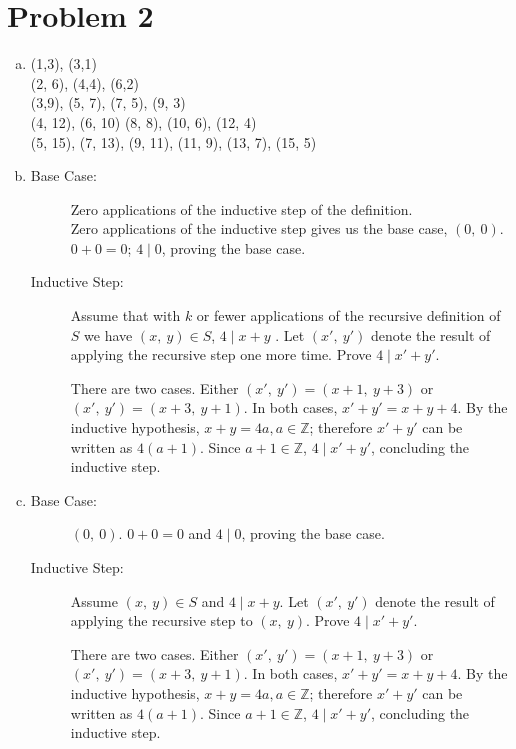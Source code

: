 \documentclass[11pt]{article}
\begin{document}
\section*{Problem 2}
	\begin{enumerate}[(a)]
		\item			
			(1,3), (3,1) \\
			(2, 6), (4,4), (6,2)	\\
			(3,9), (5, 7), (7, 5), (9, 3) \\
			(4, 12), (6, 10) (8, 8), (10, 6), (12, 4)\\
			(5, 15), (7, 13), (9, 11), (11, 9), (13, 7), (15, 5)
			
		\item \begin{description}
			
		\item[Base Case:] Zero applications of the inductive step of the 
		definition.\\
		
		Zero applications of the inductive step gives us the base case, $(0,\ 0)
		$. $0+0 = 0$; $4 \mid 0$, proving the base case.
		
		\item[Inductive Step:] Assume that with $k$ or fewer applications of the
		recursive definition of $S$ we have $(x,\ y) \in S$, $4 \mid x + y$ . 
		Let $(x',\ y')$ denote the result of applying the recursive step one 
		more time. Prove $4\mid x' + y'$.
		
		
		There are two cases. Either $(x',\ y') = (x + 1,\ y+3)$ or $(x',\ y') = 
		(x + 3,\ y+1)$. In both cases, $x' + y' = x + y + 4$. By the inductive
		hypothesis, $x + y = 4a, a \in \mathbb{Z}$; therefore $x' + y'$ can be
		written as $4(a + 1)$. Since $a+1 \in \mathbb{Z}$, $4 \mid x' + y'$,
		concluding the inductive step.
		\end{description}
		
		\item \begin{description}
		
		\item[Base Case:] $(0,\ 0)$.	$0 + 0 = 0$ and $4 \mid 0$, proving the
		base case.
		
		\item[Inductive Step:] Assume $(x,\ y) \in S$ and $4 \mid x+y$. Let
		$(x',\ y')$ denote the result of applying the recursive step to $(x,\ y)
		$. Prove $4 \mid x' + y'$.
		
		There are two cases. Either $(x',\ y') = (x + 1,\ y+3)$ or $(x',\ y') = 
		(x + 3,\ y+1)$. In both cases, $x' + y' = x + y + 4$. By the inductive
		hypothesis, $x + y = 4a, a \in \mathbb{Z}$; therefore $x' + y'$ can be
		written as $4(a + 1)$. Since $a+1 \in \mathbb{Z}$, $4 \mid x' + y'$,
		concluding the inductive step.
		

\end{description}
\end{enumerate}
\end{document}
